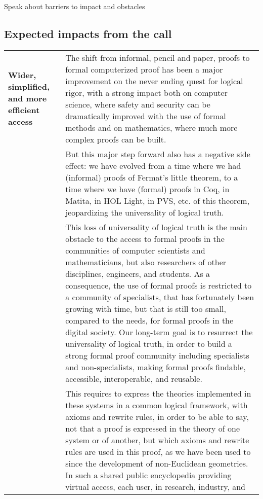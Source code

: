 {\color{red} Speak about barriers to impact and obstacles}

\subsection*{Expected impacts from the call}

\begin{longtable}{|p{}|p{}|}
\hline
{\bf Wider, simplified, and more efficient access}&
The shift from informal, pencil and paper, proofs to formal
computerized proof has been a major improvement on the never ending
quest for logical rigor, with a strong impact both on computer
science, where safety and security can be dramatically improved with
the use of formal methods and on mathematics, where much more complex
proofs can be built.\\
&
\hspace{0.4cm}
But this major step forward also has a negative side effect: we have
evolved from a time where we had (informal) proofs of Fermat's little
theorem, to a time where we have (formal) proofs in Coq, in Matita, in
HOL Light, in PVS, etc.  of this theorem, jeopardizing the
universality of logical truth.\\
&
\hspace*{0.4cm}
This loss of universality of logical truth is the main obstacle to the
access to formal proofs in the communities of computer scientists and
mathematicians, but also researchers of other disciplines, engineers,
and students. As a consequence, the use of formal proofs is restricted
to a community of specialists, that has fortunately been growing with
time, but that is still too small, compared to the needs, for formal
proofs in the digital society.  Our long-term goal is to resurrect the
universality of logical truth, in order to build a strong formal proof
community including specialists and non-specialists, making
formal proofs findable, accessible, interoperable, and reusable.\\
&
\hspace{0.4cm}
This requires to express the theories implemented in these systems in
a common logical framework, with axioms and rewrite rules, in order to
be able to say, not that a proof is expressed in the theory of one
system or of another, but which axioms and rewrite rules are used in
this proof, as we have been used to since the development of
non-Euclidean geometries. In such a shared public encyclopedia
providing virtual access, each user, in research, industry, and

\end{longtable}
